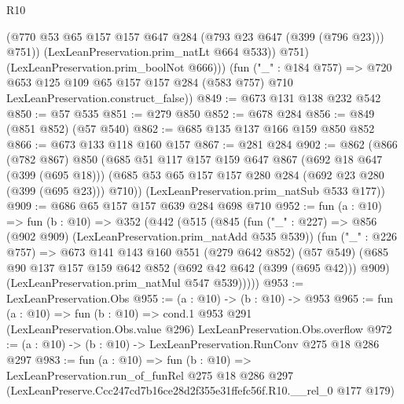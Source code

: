 \begin{lexlean}{R10}
\begin{coremodule}
                (@770 @53 @65 @157 @157 @647 @284 (@793 @23 @647 (@399 (@796 @23))) @751))
              (LexLeanPreservation.prim_natLt @664 @533))
            @751)
          (LexLeanPreservation.prim_boolNot @666)))
      (fun ("_" : @184 @757) =>
      @720 @653 @125 @109 @65 @157 @157 @284 (@583 @757) @710 LexLeanPreservation.construct_false))
@849 := @673 @131 @138 @232 @542
@850 := @57 @535
@851 := @279 @850
@852 := @678 @284
@856 := @849 (@851 @852) (@57 @540)
@862 := @685 @135 @137 @166 @159 @850 @852
@866 := @673 @133 @118 @160 @157
@867 := @281 @284
@902 := @862
    (@866
      (@782 @867)
      @850
      (@685
        @51
        @117
        @157
        @159
        @647
        @867
        (@692 @18 @647 (@399 (@695 @18)))
        (@685 @53 @65 @157 @157 @280 @284 (@692 @23 @280 (@399 (@695 @23))) @710))
      (LexLeanPreservation.prim_natSub @533 @177))
@909 := @686 @65 @157 @157 @639 @284 @698 @710
@952 := fun (a : @10) =>
  fun (b : @10) =>
  @352
    (@442
      (@515
        (@845
          (fun ("_" : @227) => @856 (@902 @909) (LexLeanPreservation.prim_natAdd @535 @539))
          (fun ("_" : @226 @757) =>
          @673
            @141
            @143
            @160
            @551
            (@279 @642 @852)
            (@57 @549)
            (@685 @90 @137 @157 @159 @642 @852 (@692 @42 @642 (@399 (@695 @42))) @909)
            (LexLeanPreservation.prim_natMul @547 @539)))))
@953 := LexLeanPreservation.Obs
@955 := (a : @10) -> (b : @10) -> @953
@965 := fun (a : @10) =>
  fun (b : @10) =>
  cond.{1} @953 @291 (LexLeanPreservation.Obs.value @296) LexLeanPreservation.Obs.overflow
@972 := (a : @10) -> (b : @10) -> LexLeanPreservation.RunConv @275 @18 @286 @297
@983 := fun (a : @10) =>
  fun (b : @10) =>
  LexLeanPreservation.run_of_funRel
    @275
    @18
    @286
    @297
    (LexLeanPreserve.Ccc247cd7b16ce28d2f355e31ffefc56f.R10.__rel_0 @177 @179)
\end{coremodule}
\end{lexlean}
